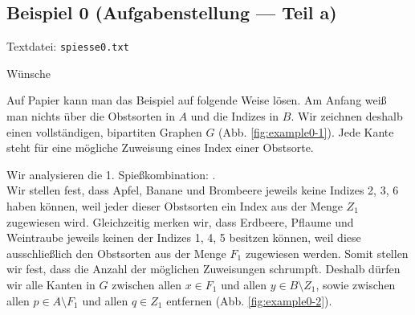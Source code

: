 \subsection{Beispiel 0 (Aufgabenstellung --- Teil a)}\label{example:0}
Textdatei: \texttt{spiesse0.txt}
\vspace{0.25cm}

\noindent
Wünsche 
\vspace{0.25cm}

\noindent
{}
\vspace{0.5cm}

Auf Papier kann man das Beispiel auf folgende Weise lösen.
Am Anfang weiß man nichts über die Obstsorten in $A$ und die Indizes in $B$.
Wir zeichnen deshalb einen vollständigen, bipartiten Graphen $G$ (Abb. \ref{fig:example0-1}).
Jede Kante steht für eine mögliche Zuweisung eines Index einer Obstsorte.

Wir analysieren die 1. Spießkombination:
.\\
Wir stellen fest, dass Apfel, Banane und Brombeere jeweils keine Indizes 2, 3, 6 haben können,
weil jeder dieser Obstsorten ein Index aus der Menge $Z_1$ zugewiesen wird.
Gleichzeitig merken wir, dass Erdbeere, Pflaume und Weintraube jeweils keinen der Indizes
1, 4, 5 besitzen können, weil diese ausschließlich den Obstsorten aus der Menge $F_1$ zugewiesen werden.
Somit stellen wir fest, dass die Anzahl der möglichen Zuweisungen schrumpft.
Deshalb dürfen wir alle Kanten in $G$ zwischen allen $x \in F_1$ und allen $y \in B \setminus Z_1$,
sowie zwischen allen $p \in A \setminus F_1$ und allen $q \in Z_1$ entfernen (Abb. \ref{fig:example0-2}).

